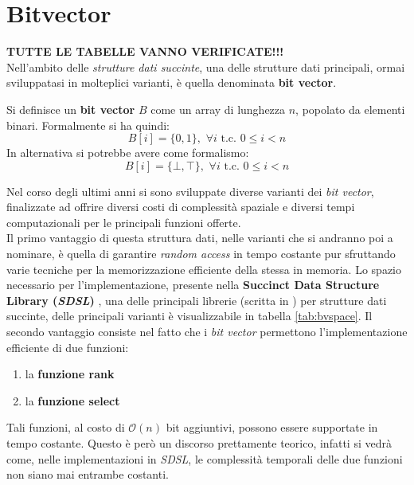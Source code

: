 \section{Bitvector}
\label{bvsec}
\textbf{TUTTE LE TABELLE VANNO VERIFICATE!!!}\\
Nell'ambito delle \textit{strutture dati succinte}, una delle strutture dati
principali, ormai sviluppatasi in molteplici varianti, è quella denominata
\textbf{bit vector}.
\begin{definizione}
  Si definisce un \textbf{bit vector} $B$ come un array di lunghezza $n$,
  popolato da elementi binari. Formalmente si ha quindi:
  \[B[i]=\{0,1\},\,\,\forall i \mbox{ t.c. } 0\leq i < n\]
  In alternativa si potrebbe avere come formalismo:
  \[B[i]=\{\bot,\top\},\,\,\forall i \mbox{ t.c. } 0\leq i < n\]
\end{definizione}
Nel corso degli ultimi anni si sono sviluppate diverse varianti dei \textit{bit
  vector}, finalizzate ad offrire diversi costi di complessità spaziale e
diversi tempi computazionali per le principali funzioni offerte.\\
Il primo vantaggio di questa struttura dati, nelle varianti che si andranno poi
a nominare, è quella di garantire \textit{random access} in tempo costante pur
sfruttando varie tecniche per la memorizzazione efficiente della stessa in
memoria. Lo spazio necessario per l'implementazione, presente nella
\textbf{Succinct Data Structure Library (\textit{SDSL})} \cite{sdsl}, una delle
  principali librerie (scritta in ) per strutture dati succinte,
  delle principali varianti è visualizzabile in tabella 
\ref{tab:bvspace}. Il secondo vantaggio consiste nel fatto che i \textit{bit
  vector} permettono l'implementazione efficiente di due funzioni:
\begin{enumerate}
  \item la \textbf{funzione rank}
  \item la \textbf{funzione select}
\end{enumerate}
Tali funzioni, al costo di $\mathcal{O}(n)$ bit aggiuntivi, possono essere
supportate in tempo costante. Questo è però un discorso prettamente teorico,
infatti si vedrà come, nelle implementazioni in \textit{SDSL}, le complessità
temporali delle due funzioni non siano mai entrambe costanti.
